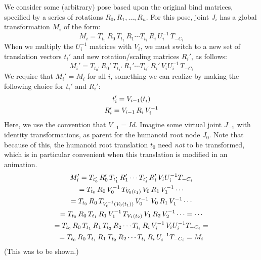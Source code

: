 We consider some (arbitrary) pose based upon the original bind matrices,
specified by a series of rotations $R_0, R_1, \ldots, R_n$.
For this pose, joint $J_i$ has a global transformation $M_i$ of the form:
%
\[ M_i = T_{t_0}\, R_0\, T_{t_1}\, R_1 \cdots T_{t_i}\, R_i\, U_i^{-1}\, T_{-C_i}\]
%
When we multiply the $U_i^{-1}$ matrices with $V_i$, we must switch to a new set of translation
vectors $t_i'$ and new rotation/scaling matrices $R_i'$, as follows:
%
\[ M_i' = T_{t_0'}\, R_0'\, T_{t_1'}\, R_1' \cdots T_{t_i'}\, R_i'\,  V_i U_i^{-1}\, T_{-C_i}\]
%
We require that $M_i' = M_i$ for all $i$, something we
can realize by making the following choice for $t_i'$ and $R_i'$:
%
\begin{gather}
t_i'= V_{i-1}(t_i)\notag\\
 R_i' = V_{i-1}\,R_i\,V_i^{-1}\notag
\end{gather}
Here, we use the convention that $V_{-1} = Id$.
Imagine some virtual joint $J_{-1}$ with identity transformations,
as parent for the humanoid root node $J_0$.
Note that because of this, the humanoid root translation $t_0$ need \emph{not} to be transformed,
which is in particular convenient when this translation is modified in an animation.
%
\begin{gather}
 M_i' = T_{t_0'}\, R_0'\, T_{t_1'}\, R_1' \cdots T_{t_i'}\, R_i'\, V_i U_i^{-1}T_{-C_i}\notag\\
 = T_{t_0}\,R_0\,V_0^{-1}\,T_{V_0(t_1)}\,V_0\,R_1\,V_1^{-1} \cdots \notag \\
 = T_{t_0}\,R_0\,T_{V_0^{-1}(V_0(t_1))}\,V_0^{-1}\,\,V_0\,R_1 \,V_1^{-1}\cdots  \notag \\
  = T_{t_0}\,R_0\,T_{t_1}\,R_1 \,V_1^{-1} \,T_{V_1(t_2)} \, V_1\,R_2\,V_2^{-1}\cdots \notag = \cdots\notag \\
  = T_{t_0}\,R_0\,T_{t_1}\,R_1\,T_{t_2}\, R_2 \cdots T_{t_i}\,R_i\,V_i^{-1}\,V_i U_{i}^{-1}T_{-C_i}  =\notag\\
   = T_{t_0}\,R_0\,T_{t_1}\,R_1\,T_{t_2}\, R_2 \cdots T_{t_i}\,R_i\,U_{i}^{-1}T_{-C_i}  = M_i\notag
\end{gather}
(This was to be shown.)


